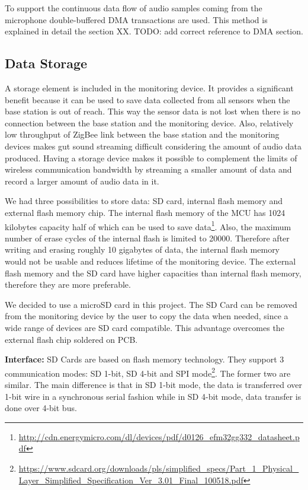 To support the continuous data flow of audio samples coming from the microphone double-buffered DMA transactions are used. This method is explained in detail the section XX. TODO: add correct reference to DMA section.


\subsection{Data Storage}
\label{sec:data_storage}
A storage element is included in the monitoring device. It provides a significant benefit because it can be used to save data collected from all sensors when the base station is out of reach. This way the sensor data is not lost when there is no connection between the base station and the monitoring device. Also, relatively low throughput of ZigBee link between the base station and the monitoring devices makes gut sound streaming difficult considering the amount of audio data produced. Having a storage device makes it possible to complement the limits of wireless communication bandwidth by streaming a smaller amount of data and record a larger amount of audio data in it. 

We had three possibilities to store data: SD card, internal flash memory and external flash memory chip. The internal flash memory of the MCU has 1024 kilobytes capacity half of which can be used to save data\footnote{\url{http://cdn.energymicro.com/dl/devices/pdf/d0126_efm32gg332_datasheet.pdf}}. Also, the maximum number of erase cycles of the internal flash is limited to 20000. Therefore after writing and erasing roughly 10 gigabytes of data, the internal flash memory would not be usable and reduces lifetime of the monitoring device. The external flash memory and the SD card have higher capacities than internal flash memory, therefore they are more preferable. 

We decided to use a microSD card in this project. The SD Card can be removed from the monitoring device by the user to copy the data when needed, since a wide range of devices are SD card compatible. This advantage overcomes the external flash chip soldered on PCB. 

\textbf{Interface:}
SD Cards are based on flash memory technology. They support 3 communication modes: SD 1-bit, SD 4-bit and SPI mode\footnote{\url{https://www.sdcard.org/downloads/pls/simplified_specs/Part_1_Physical_Layer_Simplified_Specification_Ver_3.01_Final_100518.pdf}}. The former two are similar. The main difference is that in SD 1-bit mode, the data is transferred over 1-bit wire in a synchronous serial fashion while in SD 4-bit mode, data transfer is done over 4-bit bus. 

